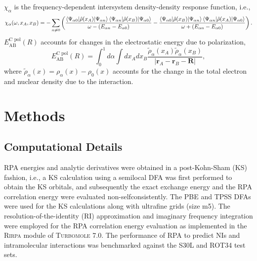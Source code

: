 \documentclass[twoside,twocolumn,9pt]{article}
\newcommand{\x}{\mathbf{r}}
\begin{document}
$\chi_{\alpha}$ is the frequency-dependent intersystem density-density
response function, i.e.,
\begin{equation}
  \chi_{\alpha}(\omega,x_A,x_B) = - \sum_{n \ne 0} \left( \frac{
      \braket{\Psi_{\alpha 0}| \hat{\rho}(x_A) | \Psi_{\alpha n}}
      \braket{\Psi_{\alpha n}| \hat{\rho}(x_B) | \Psi_{\alpha 0}} }{
      \omega - (E_{\alpha n} - E_{\alpha 0}) } - \frac{
      \braket{\Psi_{\alpha 0}| \hat{\rho}(x_B) | \Psi_{\alpha n}}
      \braket{\Psi_{\alpha n}| \hat{\rho}(x_A) | \Psi_{\alpha 0}} }{
      \omega + (E_{\alpha n} - E_{\alpha 0}) } \right).
\end{equation}
$E^{\text{C pol}}_{\text{AB}}(R)$ accounts for changes in the
electrostatic energy due to polarization,
\begin{equation}
  E^{\text{C pol}}_{\text{AB}}(R) = \int_0^{1} d\alpha \int dx_A dx_B
  \frac{ \tilde{\rho}_{\alpha}(x_A) \tilde{\rho}_{\alpha}(x_B) }{|\x_A
    -\x_B -\mathbf{R}|},
\end{equation}
where $\tilde{\rho}_{\alpha}(x) = \rho_{\alpha}(x) - \rho_0(x)$ accounts
for the change in the total electron and nuclear density due to the
interaction. 


\section{Methods}
\subsection{Computational Details}

RPA energies and analytic derivatives were obtained in a post-Kohn-Sham (KS)
fashion, i.e., a KS calculation using a semilocal DFA was first performed
to obtain the KS orbitals, and subsequently the exact exchange energy
and the RPA correlation energy were evaluated non-selfconsistently. The
PBE\cite{Perdew96PhysRevLett77p3865} and TPSS\cite{Tao03PhysRevLett91p146401}
DFAs were used for the KS calculations along with ultrafine grids (size
m5\cite{Treutler95JChemPhys102p346}). The resolution-of-the-identity 
(RI) approximation and imaginary frequency integration were
employed for the RPA correlation energy evaluation as implemented in
the \textsc{Rirpa} module\cite{Eshuis10JChemPhys132p234114} of \textsc{Turbomole 7.0}.
\cite{Furche14WIREsComputMolSci4p91} The performance of RPA to predict
NIs and intramolecular interactions was benchmarked against the
S30L and ROT34 test sets.
\end{document}
